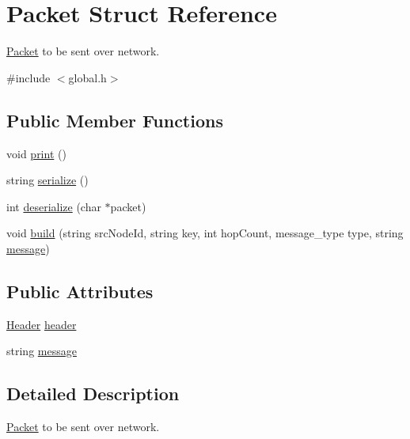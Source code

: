 \hypertarget{structPacket}{\section{Packet Struct Reference}
\label{structPacket}
}


\hyperlink{structPacket}{Packet} to be sent over network.  




{\ttfamily \#include $<$global.\-h$>$}

\subsection*{Public Member Functions}
\begin{DoxyCompactItemize}
\item 
void \hyperlink{structPacket_ab517659d7493a32249b98943852f25c9}{print} ()
\item 
string \hyperlink{structPacket_ae88c83f945fcb9e662a915220f2c3e2e}{serialize} ()
\item 
int \hyperlink{structPacket_a4556cf148dc34b717933303580602b56}{deserialize} (char $\ast$packet)
\item 
void \hyperlink{structPacket_a949ae4108926c0c62341d302d796dd24}{build} (string src\-Node\-Id, string key, int hop\-Count, message\-\_\-type type, string \hyperlink{structPacket_a8634c4b3877735f707488d1c7a16454c}{message})
\end{DoxyCompactItemize}
\subsection*{Public Attributes}
\begin{DoxyCompactItemize}
\item 
\hyperlink{structHeader}{Header} \hyperlink{structPacket_ae19cf919ad4dc07d036f47de65521d12}{header}
\item 
string \hyperlink{structPacket_a8634c4b3877735f707488d1c7a16454c}{message}
\end{DoxyCompactItemize}


\subsection{Detailed Description}
\hyperlink{structPacket}{Packet} to be sent over network. 

